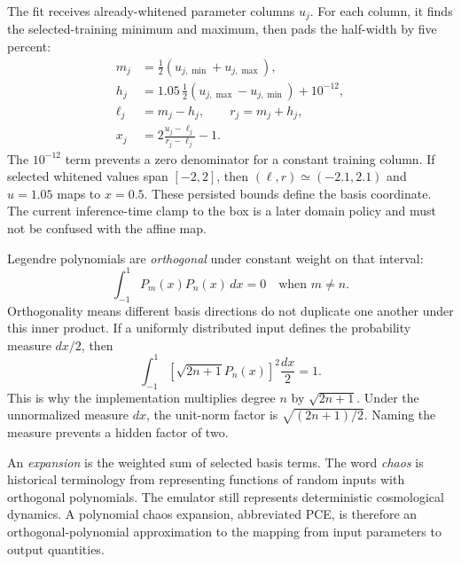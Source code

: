 \documentclass[10pt,aps,prd,twocolumn,nofootinbib]{revtex4-2}
\begin{document}
The fit receives already-whitened parameter columns $u_j$.  For each column,
it finds the selected-training minimum and maximum, then pads the half-width
by five percent:
\begin{align*}
 m_j&=\tfrac12(u_{j,\min}+u_{j,\max}),\\
 h_j&=1.05\,\tfrac12(u_{j,\max}-u_{j,\min})+10^{-12},\\
 \ell_j&=m_j-h_j,\qquad r_j=m_j+h_j,\\
 x_j&=2\frac{u_j-\ell_j}{r_j-\ell_j}-1.
\end{align*}
The $10^{-12}$ term prevents a zero denominator for a constant training
column.  If selected whitened values span $[-2,2]$, then
$(\ell,r)\simeq(-2.1,2.1)$ and $u=1.05$ maps to $x=0.5$.  These persisted
bounds define the basis coordinate.  The current inference-time clamp to the
box is a later domain policy and must not be confused with the affine map.

Legendre polynomials are \emph{orthogonal} under constant weight on that
interval:
\begin{equation*}
 \int_{-1}^{1}P_m(x)P_n(x)\,dx=0
 \quad\text{when }m\ne n.
\end{equation*}
Orthogonality means different basis directions do not duplicate one another
under this inner product.  If a uniformly distributed input defines the
probability measure \(dx/2\), then
\begin{equation*}
 \int_{-1}^{1}
 \left[\sqrt{2n+1}P_n(x)\right]^2\frac{dx}{2}=1.
\end{equation*}
This is why the implementation multiplies degree \(n\) by
\(\sqrt{2n+1}\).  Under the unnormalized measure \(dx\), the unit-norm factor
is \(\sqrt{(2n+1)/2}\).  Naming the measure prevents a hidden
factor of two.

An \emph{expansion} is the weighted sum of selected basis terms.  The word
\emph{chaos} is historical terminology from representing functions of random
inputs with orthogonal polynomials.  The emulator still represents
deterministic cosmological dynamics.  A polynomial chaos expansion, abbreviated
PCE, is therefore an orthogonal-polynomial approximation to the mapping from
input parameters to output quantities.
\end{document}
